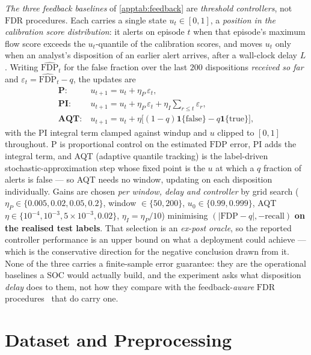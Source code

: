 \documentclass[conference]{IEEEtran}
\newcommand{\FDP}{\mathrm{FDP}}
\newcommand{\FDR}{\mathrm{FDR}}
\begin{document}
\emph{The three feedback baselines} of \cref{apptab:feedback} are \emph{threshold controllers}, not
$\FDR$ procedures. Each carries a single state $u_t\in[0,1]$, a \emph{position in the calibration
score distribution}: it alerts on episode $t$ when that episode's maximum flow score exceeds the
$u_t$-quantile of the calibration scores, and moves $u_t$ only when an analyst's disposition of an
earlier alert arrives, after a wall-clock delay $L$. Writing $\widehat{\FDP}_t$ for the false fraction
over the last $200$ dispositions \emph{received so far} and $\varepsilon_t=\widehat{\FDP}_t-q$, the
updates are
{\small\begin{align*}
\textbf{P:}\ &u_{t+1}=u_t+\eta_P\,\varepsilon_t,\\
\textbf{PI:}\ &u_{t+1}=u_t+\eta_P\,\varepsilon_t+\eta_I\textstyle\sum_{r\le t}\varepsilon_r,\\
\textbf{AQT:}\ &u_{t+1}=u_t+\eta\big[(1{-}q)\mathbf 1\{\text{false}\}-q\mathbf 1\{\text{true}\}\big],
\end{align*}}%
with the PI integral term clamped against windup and $u$ clipped to $[0,1]$ throughout. P is proportional control on the estimated $\FDP$ error, PI adds
the integral term, and AQT (adaptive quantile tracking) is the label-driven
stochastic-approximation step whose fixed point is the $u$ at which a $q$ fraction of alerts is
false --- so AQT needs no window, updating on each disposition individually.
Gains are chosen \emph{per window, delay and controller} by grid search
($\eta_P\in\{0.005,0.02,0.05,0.2\}$, window $\in\{50,200\}$, $u_0\in\{0.99,0.999\}$, AQT
$\eta\in\{10^{-4},10^{-3},5\times10^{-3},0.02\}$, $\eta_I=\eta_P/10$) minimising
$(\lvert\FDP-q\rvert,-\text{recall})$ \textbf{on the realised test labels}. That selection is an
\emph{ex-post oracle}, so the reported controller performance is an upper bound on what a deployment
could achieve --- which is the conservative direction for the negative conclusion drawn from it.
None of the three carries a finite-sample error guarantee: they are the operational baselines a SOC
would actually build, and the experiment asks what disposition \emph{delay} does to them, not how they
compare with the feedback-\emph{aware} $\FDR$ procedures~\cite{lu2026gaif} that do carry one.

\section{Dataset and Preprocessing}\label{app:data}
\end{document}
